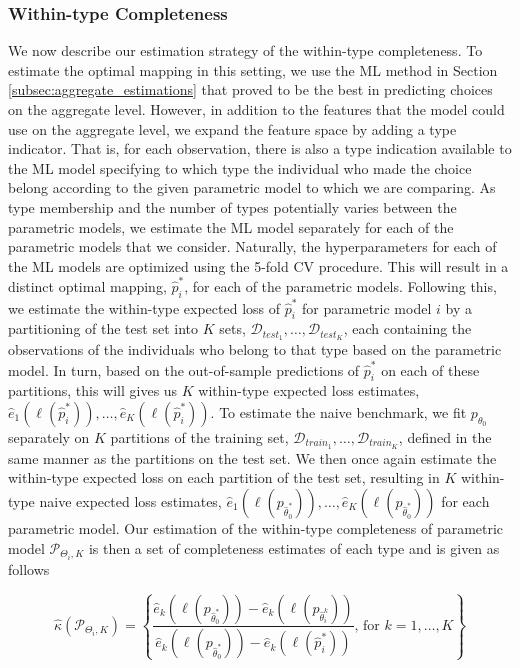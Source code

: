 \documentclass[11pt,a4paper]{article}
\theoremstyle{definition}
\begin{document}
\subsubsection{Within-type Completeness}
\label{subsubsec:within-type_completeness}
We now describe our estimation strategy of the within-type completeness. To estimate the optimal mapping in this setting, we use the ML method in Section \ref{subsec:aggregate_estimations} that proved to be the best in predicting choices on the aggregate level. However, in addition to the features that the model could use on the aggregate level, we expand the feature space by adding a type indicator. That is, for each observation, there is also a type indication available to the ML model specifying to which type the individual who made the choice belong according to the given parametric model to which we are comparing. As type membership and the number of types potentially varies between the parametric models, we estimate the ML model separately for each of the parametric models that we consider. Naturally, the hyperparameters for each of the ML models are optimized using the 5-fold CV procedure. This will result in a distinct optimal mapping, \(\hat{p}^*_{i}\), for each of the parametric models. Following this, we estimate the within-type expected loss of \(\hat{p}^*_{i}\) for parametric model \(i\) by a partitioning of the test set into \(K\) sets, \(\mathcal{D}_{test_1},\dots,\mathcal{D}_{test_K}\), each containing the observations of the individuals who belong to that type based on the parametric model. In turn, based on the out-of-sample predictions of \(\hat{p}^*_{i}\) on each of these partitions, this will gives us \(K\) within-type expected loss estimates,  \(\hat{e}_1(\ell(\hat{p}^{*}_{i})),\dots,\hat{e}_K(\ell(\hat{p}^{*}_{i}))\). To estimate the naive benchmark, we fit \(p_{\theta_{0}}\) separately on \(K\) partitions of the training set, \(\mathcal{D}_{train_1},\dots,\mathcal{D}_{train_K}\),  defined in the same manner as the partitions on the test set. We then once again estimate the within-type expected loss on each partition of the test set, resulting in \(K\) within-type naive expected loss estimates, \(\hat{e}_1(\ell(p_{\hat{\theta}^{*}_{0}})),\dots,\hat{e}_K(\ell(p_{\hat{\theta}^{*}_{0}}))\) for each parametric model. Our estimation of the within-type completeness of parametric model \(\mathcal{P}_{\Theta_i,K}\) is then a set of completeness estimates of each type and is given as follows

\begin{equation}
\label{eq:type-completeness_estim}
\hat{\kappa}(\mathcal{P}_{\Theta_i,K})=\left\{\frac{\hat{e}_k(\ell(p_{\hat{\theta}^*_{0}}))-\hat{e}_k(\ell(p_{\hat{\theta}^{k}_{i}}))}{\hat{e}_k(\ell(p_{\hat{\theta}^*_{0}}))-\hat{e}_k(\ell(\hat{p}^{*}_{i}))}\text{, for } k=1,\dots, K\right\}
\end{equation}
\end{document}
